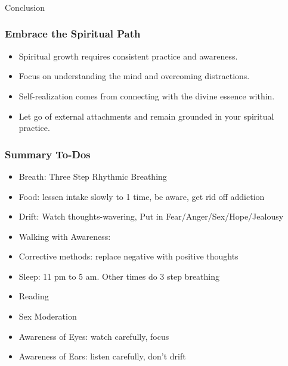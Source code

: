 \begin{frame}[fragile]\frametitle{}
\begin{center}
{\Large Conclusion}
\end{center}
\end{frame}

\begin{frame}[fragile]\frametitle{Embrace the Spiritual Path}
\begin{itemize}
    \item Spiritual growth requires consistent practice and awareness.
    \item Focus on understanding the mind and overcoming distractions.
    \item Self-realization comes from connecting with the divine essence within.
    \item Let go of external attachments and remain grounded in your spiritual practice.
\end{itemize}
\end{frame}


\begin{frame}[fragile]
\frametitle{Summary To-Dos}
\begin{itemize}
\item Breath: Three Step Rhythmic Breathing
\item Food: lessen intake slowly to 1 time, be aware, get rid off addiction
\item Drift: Watch thoughts-wavering, Put in Fear/Anger/Sex/Hope/Jealousy
\item Walking with Awareness: 
\item Corrective methods: replace negative with positive thoughts
\item Sleep: 11 pm to 5 am. Other times do 3 step breathing
\item Reading
\item Sex Moderation
\item Awareness of Eyes: watch carefully, focus
\item Awareness of Ears: listen carefully, don't drift
\end{itemize}
\end{frame}